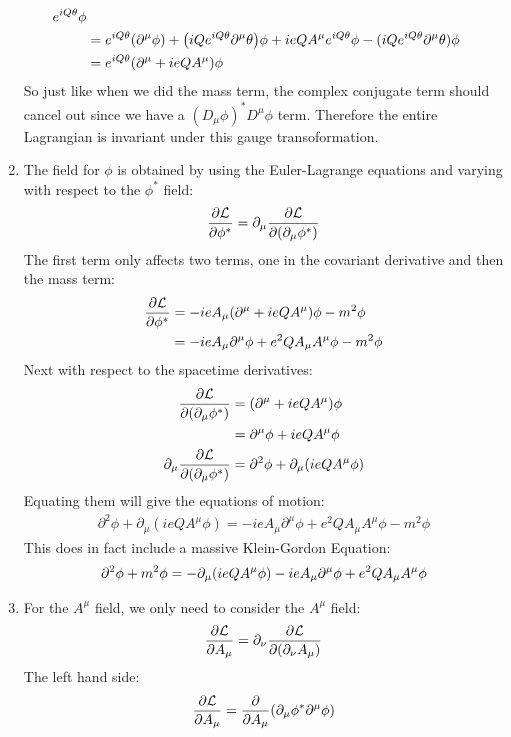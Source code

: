 \documentclass[12pt]{article}
\renewcommand{\L}{\mathcal{L}}
\newcommand{\D}{\partial}
\begin{document}
\begin{enumerate}[label=\alph*)]
\begin{align*}
    e^{iQ\theta}\phi\\
    &=e^{iQ\theta}(\D^\mu\phi)+\qty(iQe^{iQ\theta}\D^\mu\theta)\phi+
    ieQA^\mu e^{iQ\theta}\phi-(iQe^{iQ\theta}\D^\mu\theta)\phi\\
    &=e^{iQ\theta}\qty(\D^\mu+ieQA^\mu)\phi
  \end{align*}
  So just like when we did the mass term, the complex conjugate term should cancel out since we have a $(D_\mu\phi)^*D^\mu\phi$ term. Therefore the entire Lagrangian is invariant under this gauge transoformation. 
\item The field for $\phi$ is obtained by using the Euler-Lagrange equations and varying with respect to the $\phi^*$ field:
  \begin{align*}
    \pdv{\L}{\phi^*}=\D_\mu\pdv{\L}{(\D_\mu\phi^*)}
  \end{align*}
  The first term only affects two terms, one in the covariant derivative and then the mass term:
  \begin{align*}
    \pdv{\L}{\phi^*}&=-ieA_\mu\qty(\D^\mu+ieQA^\mu)\phi-m^2\phi\\
    &=-ieA_\mu\D^\mu\phi+e^2QA_\mu A^\mu\phi-m^2\phi
  \end{align*}
  Next with respect to the spacetime derivatives:
  \begin{align*}
    \pdv{\L}{(\D_\mu\phi^*)}&=\qty(\D^\mu+ieQA^\mu)\phi\\
    &=\D^\mu\phi+ieQA^\mu\phi\\
    \D_\mu\pdv{\L}{(\D_\mu\phi^*)}&=\D^2\phi+\D_\mu\qty(ieQA^\mu\phi)
  \end{align*}
  Equating them will give the equations of motion:
  \begin{align*}
    \D^2\phi+\D_\mu(ieQA^\mu\phi)=-ieA_\mu\D^\mu\phi+e^2QA_\mu A^\mu\phi-m^2\phi
  \end{align*}
  This does in fact include a massive Klein-Gordon Equation:
  \begin{align*}
    \D^2\phi+m^2\phi=
    -\D_\mu\qty(ieQA^\mu\phi)-ieA_\mu\D^\mu\phi+e^2QA_\mu A^\mu\phi
  \end{align*}
\item For the $A^\mu$ field, we only need to consider the $A^\mu$ field:
  \begin{align*}
    \pdv{\L}{A_\mu}=\D_\nu\pdv{\L}{(\D_\nu A_\mu)}
  \end{align*}
  The left hand side:
  \begin{align*}
    \pdv{\L}{A_\mu}=\pdv{A_\mu}\qty(\D_\mu\phi^*\D^\mu\phi)
  \end{align*}
\end{enumerate}
\end{document}
